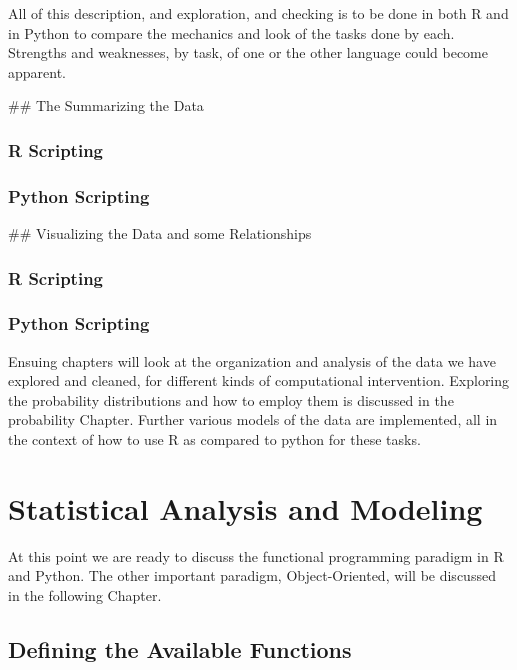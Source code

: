 \documentclass[]{book}
\theoremstyle{definition}
\theoremstyle{definition}
\theoremstyle{definition}
\theoremstyle{remark}
\begin{document}
All of this description, and exploration, and checking is to be done in
both R and in Python to compare the mechanics and look of the tasks done
by each. Strengths and weaknesses, by task, of one or the other language
could become apparent.

 \#\# The Summarizing the Data

\subsection{R Scripting}\label{r-scripting-7}

\subsection{Python Scripting}\label{python-scripting-8}

 \#\# Visualizing the Data and some
Relationships

\subsection{R Scripting}\label{r-scripting-8}

\subsection{Python Scripting}\label{python-scripting-9}

Ensuing chapters will look at the organization and analysis of the data
we have explored and cleaned, for different kinds of computational
intervention. Exploring the probability distributions and how to employ
them is discussed in the probability Chapter. Further various models of
the data are implemented, all in the context of how to use R as compared
to python for these tasks.

\chapter{Statistical Analysis and
Modeling}\label{statistical-analysis-and-modeling}

At this point we are ready to discuss the functional programming
paradigm in R and Python. The other important paradigm, Object-Oriented,
will be discussed in the following Chapter.

 

\section{Defining the Available
Functions}\label{defining-the-available-functions}
\end{document}
